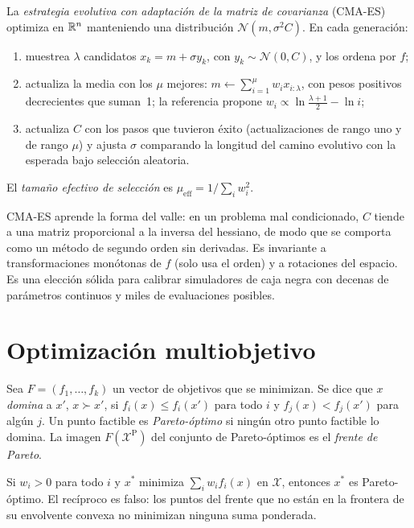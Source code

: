 \begin{definicion}[CMA-ES]\label{def:cmaes}
La \emph{estrategia evolutiva con adaptación de la matriz de covarianza} (CMA-ES)~\cite{hansen} optimiza en $\mathbb{R}^{n}$ manteniendo una distribución $\mathcal N(m,\sigma^{2}C)$. En cada generación:
\begin{enumerate}[label=\arabic*.]
  \item muestrea $\lambda$ candidatos $x_k=m+\sigma y_k$, con $y_k\sim\mathcal N(0,C)$, y los ordena por $f$;
  \item actualiza la media con los $\mu$ mejores: $m\leftarrow\sum_{i=1}^{\mu}w_ix_{i:\lambda}$, con pesos positivos decrecientes que suman~1; la referencia propone $w_i\propto\ln\frac{\lambda+1}{2}-\ln i$;
  \item actualiza $C$ con los pasos que tuvieron éxito (actualizaciones de rango uno y de rango $\mu$) y ajusta $\sigma$ comparando la longitud del camino evolutivo con la esperada bajo selección aleatoria.
\end{enumerate}
El \emph{tamaño efectivo de selección} es $\mu_{\mathrm{eff}}=1/\sum_iw_i^{2}$.
\end{definicion}

CMA-ES aprende la forma del valle: en un problema mal condicionado, $C$ tiende a una matriz proporcional a la inversa del hessiano, de modo que se comporta como un método de segundo orden sin derivadas. Es invariante a transformaciones monótonas de $f$ (solo usa el orden) y a rotaciones del espacio. Es una elección sólida para calibrar simuladores de caja negra con decenas de parámetros continuos y miles de evaluaciones posibles.

\section{Optimización multiobjetivo}

\begin{definicion}\label{def:pareto}
Sea $F=(f_1,\dots,f_k)$ un vector de objetivos que se minimizan. Se dice que $x$ \emph{domina} a $x'$, $x\succ x'$, si $f_i(x)\le f_i(x')$ para todo $i$ y $f_j(x)<f_j(x')$ para algún $j$. Un punto factible es \emph{Pareto-óptimo} si ningún otro punto factible lo domina. La imagen $F(\mathcal{X}^{\mathrm{P}})$ del conjunto de Pareto-óptimos es el \emph{frente de Pareto}.
\end{definicion}

\begin{proposicion}\label{prop:suma-ponderada}
Si $w_i>0$ para todo $i$ y $x^{*}$ minimiza $\sum_iw_if_i(x)$ en $\mathcal{X}$, entonces $x^{*}$ es Pareto-óptimo. El recíproco es falso: los puntos del frente que no están en la frontera de su envolvente convexa no minimizan ninguna suma ponderada.
\end{proposicion}


